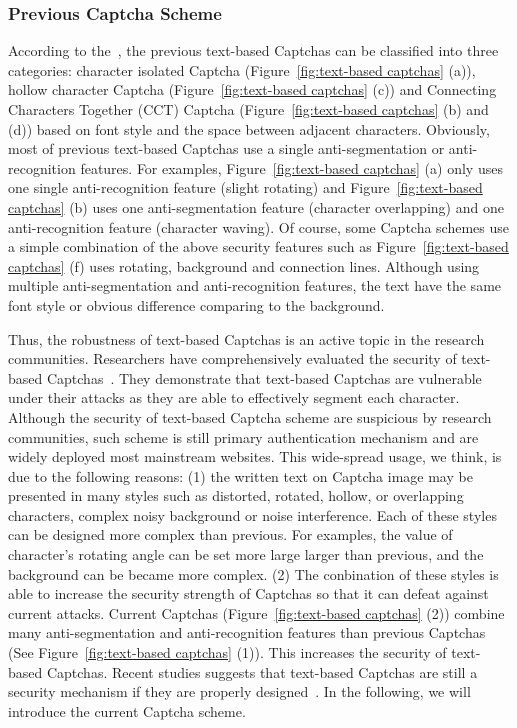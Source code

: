 \subsubsection{Previous Captcha Scheme}
According to the~\cite{Gao2016A}, the previous text-based Captchas can be classified into three categories: character isolated Captcha (Figure~\ref{fig:text-based captchas} (a)), hollow character Captcha (Figure~\ref{fig:text-based captchas} (c)) and Connecting Characters Together (CCT) Captcha (Figure~\ref{fig:text-based captchas} (b) and (d)) based on font style and the space between adjacent characters. Obviously, most of previous text-based Captchas use a single anti-segmentation or anti-recognition features. For examples, Figure~\ref{fig:text-based captchas} (a) only uses one single anti-recognition feature (slight rotating) and Figure~\ref{fig:text-based captchas} (b) uses one anti-segmentation feature (character overlapping) and one anti-recognition feature (character waving).
Of course, some Captcha schemes use a simple combination of the above security features such as Figure~\ref{fig:text-based captchas} (f) uses rotating, background and connection lines. Although using multiple anti-segmentation and anti-recognition features, the text have the same font style or obvious difference comparing to the background.

Thus, the robustness of text-based Captchas is an active topic in the research communities. Researchers have comprehensively evaluated the security of text-based Captchas~\cite{Bursztein2011Text,Bursztein2014The,Gao2016A}.
They demonstrate that text-based Captchas are vulnerable under their attacks as they are able to effectively segment each character. Although the security of text-based Captcha scheme are suspicious by research communities, such scheme is still primary authentication mechanism and are widely deployed most mainstream websites. This wide-spread usage, we think, is due to the following reasons:
(1) the written text on Captcha image may be presented in many styles such as distorted, rotated, hollow, or overlapping characters, complex noisy background or noise interference.
Each of these styles can be designed more complex than previous. For examples, the value of character's rotating angle can be set more large larger than previous, and the background can be became more complex.
(2) The conbination of these styles is able to increase the security strength of Captchas so that it can defeat against current attacks. Current Captchas (Figure~\ref{fig:text-based captchas} (2)) combine many anti-segmentation and anti-recognition features than previous Captchas (See Figure~\ref{fig:text-based captchas} (1)). This increases the security of text-based Captchas. Recent studies suggests that text-based Captchas are still a security mechanism if they are properly designed~\cite{Thomas2013Trafficking,Bursztein2014Easy}. In the following, we will introduce the current Captcha scheme.

